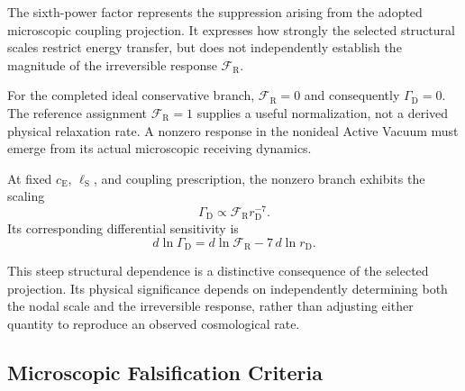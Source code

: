 The sixth-power factor represents the suppression arising
from the adopted microscopic coupling projection. It
expresses how strongly the selected structural scales
restrict energy transfer, but does not independently
establish the magnitude of the irreversible response
$\mathcal F_{\mathrm R}$.

For the completed ideal conservative branch,
$\mathcal F_{\mathrm R}=0$ and consequently
$\Gamma_{\mathrm D}=0$. The reference assignment
$\mathcal F_{\mathrm R}=1$ supplies a useful normalization,
not a derived physical relaxation rate. A nonzero response
in the nonideal Active Vacuum must emerge from its actual
microscopic receiving dynamics.

At fixed $c_{\mathrm E}$, $\ell_{\mathrm S}$, and coupling
prescription, the nonzero branch exhibits the scaling
\begin{equation}
\Gamma_{\mathrm D}\propto
\mathcal F_{\mathrm R}r_{\mathrm D}^{-7}.
\end{equation}
Its corresponding differential sensitivity is
\begin{equation}
d\ln\Gamma_{\mathrm D}
=
d\ln\mathcal F_{\mathrm R}
-
7\,d\ln r_{\mathrm D}.
\end{equation}

This steep structural dependence is a distinctive
consequence of the selected projection. Its physical
significance depends on independently determining both
the nodal scale and the irreversible response, rather
than adjusting either quantity to reproduce an observed
cosmological rate.

\subsection*{Microscopic Falsification Criteria}

